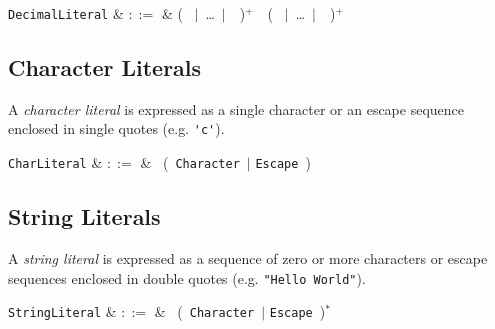 \begin{syntax}
  \verb+DecimalLiteral+ & $::=$ & \big( \ $|$\ \ldots\ $|$\ \ \big)$^+$\ \ \big( \ $|$\ \ldots\ $|$\ \ \big)$^+$ \\
\end{syntax}

\subsection{Character Literals}

A {\em character literal} is expressed as a single character or an escape sequence enclosed in single quotes (e.g. \lstinline{'c'}).

\begin{syntax}
  \verb+CharLiteral+ & $::=$ & \ \big(\ \verb+Character+\ $|$ \verb+Escape+\ \big)\  \\
\end{syntax}

\subsection{String Literals}

A {\em string literal} is expressed as a sequence of zero or more characters or escape sequences enclosed in double quotes (e.g. \lstinline{"Hello World"}).

\begin{syntax}
  \verb+StringLiteral+ & $::=$ & \ \big(\ \verb+Character+\ $|$ \verb+Escape+\ \big)$^*$\  \\
\end{syntax}
